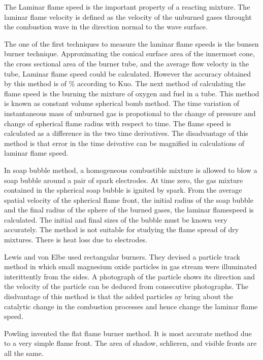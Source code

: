 \noindent The Laminar flame speed is the important property of a reacting mixture. The laminar flame velocity is defined as the velocity of the unburned gases throught the combustion wave in the direction normal to the wave surface. 

\noindent The one of the first techniques to measure the laminar flame speeds is the bunsen burner technique. Approximating the conical surface area of the innermost cone, the cross sectional area of the burner tube, and the average flow velocty in the tube, Laminar flame speed could be calculated. However the accuracy obtained by this method is of  \% according to Kuo\cite{Kuo}. The next method of calculating the flame speed is the burning the mixture of oxygen and fuel in a tube. This method is known as constant volume spherical bomb method\cite{Kuo}. The time variation of instantaneous mass of unburned gas is propotional to the change of pressure and change of spherical flame radius with respect to time. The flame speed is calculated as a difference in the two time derivatives. The disadvantage of this method is that error in the time deivative can be magnified in calculations of laminar flame speed. 

\noindent In soap bubble method, a homogeneous combustible mixture is allowed to blow a soap bubble around a pair of spark electrodes. At time zero, the gas mixture contained in the spherical soap bubble is ignited by spark. From the average spatial velocity of the spherical flame front, the initial radius of the soap bubble and the final radius of the sphere of the burned gases, the laminar flamespeed is calculated. The initial and final sizes of the bubble must be known very accurately. The method is not suitable for studying the flame spread of dry mixtures. There is heat loss due to electrodes. 

\noindent Lewis and von Elbe\cite{lewis} used rectangular burners. They devised a particle track method in which small magnesium oxide particles in gas stream were illuminated interittently from the sides. A photograph of the particle shows its direction and the velocity of the particle can be deduced from consecutive photographs. The disdvantage of this method is that the added particles ay bring about the catalytic change in the combustion processes and hence change the laminar flame speed. 

\noindent Powling\cite{powling} invented the flat flame burner method. It is most accurate method due to a very simple flame front. The area of shadow, schlieren, and visible fronts are all the same. 




